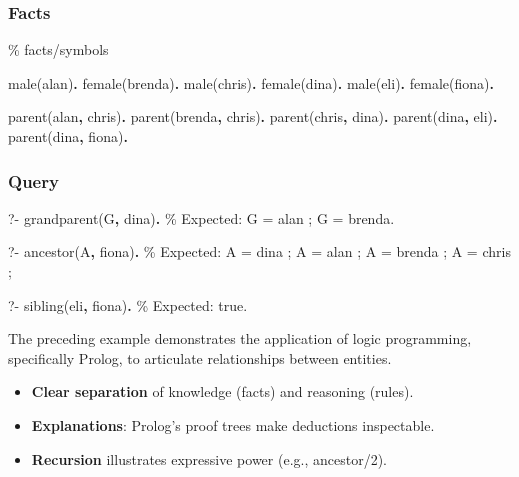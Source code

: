 \documentclass[
  letterpaper,
  DIV=11,
  numbers=noendperiod]{scrartcl}
\newenvironment{Shaded}{\begin{snugshade}}{\end{snugshade}}
\newcommand{\CommentTok}[1]{\textcolor[rgb]{0.37,0.37,0.37}{#1}}
\newcommand{\DataTypeTok}[1]{\textcolor[rgb]{0.68,0.00,0.00}{#1}}
\newcommand{\FunctionTok}[1]{\textcolor[rgb]{0.28,0.35,0.67}{#1}}
\newcommand{\KeywordTok}[1]{\textcolor[rgb]{0.00,0.23,0.31}{\textbf{#1}}}
\newcommand{\NormalTok}[1]{\textcolor[rgb]{0.00,0.23,0.31}{#1}}
\providecommand{\tightlist}{%
  \setlength{\itemsep}{0pt}\setlength{\parskip}{0pt}}
\begin{document}
\subsubsection{Facts}\label{facts}

\begin{Shaded}
\begin{Highlighting}[]
\CommentTok{\% facts/symbols}

\NormalTok{male(alan)}\KeywordTok{.}\NormalTok{  female(brenda)}\KeywordTok{.}
\NormalTok{male(chris)}\KeywordTok{.}\NormalTok{ female(dina)}\KeywordTok{.}
\NormalTok{male(eli)}\KeywordTok{.}\NormalTok{   female(fiona)}\KeywordTok{.}

\NormalTok{parent(alan}\KeywordTok{,}\NormalTok{ chris)}\KeywordTok{.}
\NormalTok{parent(brenda}\KeywordTok{,}\NormalTok{ chris)}\KeywordTok{.}
\NormalTok{parent(chris}\KeywordTok{,}\NormalTok{ dina)}\KeywordTok{.}
\NormalTok{parent(dina}\KeywordTok{,}\NormalTok{ eli)}\KeywordTok{.}
\NormalTok{parent(dina}\KeywordTok{,}\NormalTok{ fiona)}\KeywordTok{.}
\end{Highlighting}
\end{Shaded}

\subsubsection{Query}\label{query}

\begin{Shaded}
\begin{Highlighting}[]
\FunctionTok{?{-}}\NormalTok{ grandparent(}\DataTypeTok{G}\KeywordTok{,}\NormalTok{ dina)}\KeywordTok{.}
\CommentTok{\% Expected: G = alan ; G = brenda.}

\FunctionTok{?{-}}\NormalTok{ ancestor(}\DataTypeTok{A}\KeywordTok{,}\NormalTok{ fiona)}\KeywordTok{.}
\CommentTok{\% Expected: A = dina ; A = alan ; A = brenda ; A = chris ;}

\FunctionTok{?{-}}\NormalTok{ sibling(eli}\KeywordTok{,}\NormalTok{ fiona)}\KeywordTok{.}
\CommentTok{\% Expected: true.}
\end{Highlighting}
\end{Shaded}

The preceding example demonstrates the application of logic programming,
specifically Prolog, to articulate relationships between entities.

\begin{itemize}
\tightlist
\item
  \textbf{Clear separation} of knowledge (facts) and reasoning (rules).
\item
  \textbf{Explanations}: Prolog's proof trees make deductions
  inspectable.
\item
  \textbf{Recursion} illustrates expressive power (e.g., ancestor/2).
\end{itemize}
\end{document}
